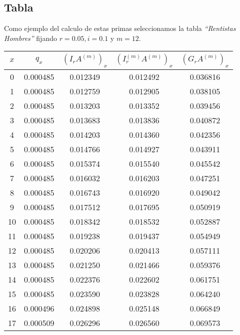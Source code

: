 \subsection{Tabla}

Como ejemplo del calculo de estas primas seleccionamos la tabla \textsl{``Rentistas Hombres''} fijando $r = 0.05, i=0.1$ y $m=12$.

\begin{center}
\begin{tabular}{|c|c|c|c|c|}
    \hline
    $x$ & $q_x$ & $(I_rA^{(m)})_x$ & $(I^{(m)}_rA^{(m)})_x$ & $(G_rA^{(m)})_x$ \\
    \hline
    0     & 0.000485   & 0.012349     & 0.012492     & 0.036816 \\
    1     & 0.000485   & 0.012759     & 0.012905     & 0.038105 \\ 
    2     & 0.000485   & 0.013203     & 0.013352     & 0.039456 \\ 
    3     & 0.000485   & 0.013683     & 0.013836     & 0.040872 \\ 
    4     & 0.000485   & 0.014203     & 0.014360     & 0.042356 \\ 
    5     & 0.000485   & 0.014766     & 0.014927     & 0.043911 \\ 
    6     & 0.000485   & 0.015374     & 0.015540     & 0.045542 \\ 
    7     & 0.000485   & 0.016032     & 0.016203     & 0.047251 \\ 
    8     & 0.000485   & 0.016743     & 0.016920     & 0.049042 \\ 
    9     & 0.000485   & 0.017512     & 0.017695     & 0.050919 \\ 
    10    & 0.000485   & 0.018342     & 0.018532     & 0.052887 \\ 
    11    & 0.000485   & 0.019238     & 0.019437     & 0.054949 \\ 
    12    & 0.000485   & 0.020206     & 0.020413     & 0.057111 \\ 
    13    & 0.000485   & 0.021250     & 0.021466     & 0.059376 \\ 
    14    & 0.000485   & 0.022376     & 0.022602     & 0.061751 \\ 
    15    & 0.000485   & 0.023590     & 0.023828     & 0.064240 \\ 
    16    & 0.000496   & 0.024898     & 0.025148     & 0.066849 \\ 
    17    & 0.000509   & 0.026296     & 0.026560     & 0.069573 \\ 

\end{tabular}
\end{center}
